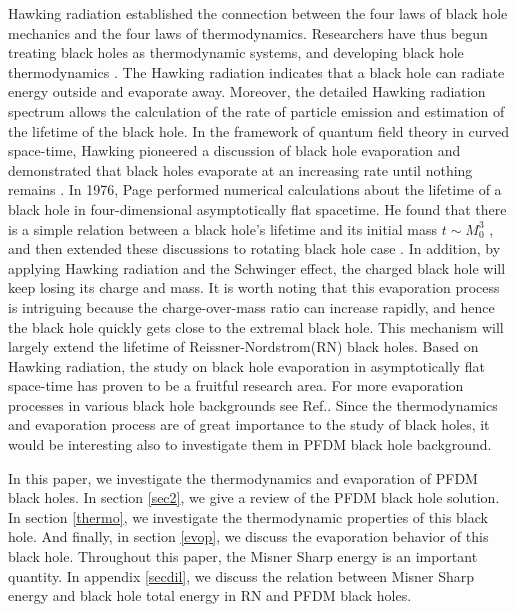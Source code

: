 \documentclass[a4paper,11pt]{article}
\begin{document}
Hawking radiation established the connection between the four laws of black hole mechanics and the four laws of thermodynamics. Researchers have thus begun treating black holes as thermodynamic systems, and developing black hole thermodynamics \cite{Hawking:1976de,Hawking:1982dh}. The Hawking radiation indicates that a black hole can radiate energy outside and evaporate away. Moreover, the detailed Hawking radiation spectrum allows the calculation of the rate of particle emission and estimation of the lifetime of the black hole. In the framework of quantum field theory in curved space-time, Hawking pioneered a discussion of black hole evaporation and demonstrated that black holes evaporate at an increasing rate until nothing remains \cite{Hawking:1974rv,Hawking:1975vcx}. In 1976, Page performed numerical calculations about the lifetime of a black hole in four-dimensional asymptotically flat spacetime. He found that there is a simple relation between a black hole's lifetime and its initial mass $t \sim M_0^3$ \cite{Page:1976df},  and then extended these discussions to rotating black hole case \cite{Page:1976ki}. In addition, by applying Hawking radiation and the Schwinger effect, the charged black hole will keep losing its charge and mass. It is worth noting that this evaporation process is intriguing  because the charge-over-mass ratio can increase rapidly, and hence the black hole quickly gets close to the extremal black hole. This mechanism will largely extend the lifetime of Reissner-Nordstrom(RN) black holes\cite{Hiscock:1990ex,Xu:2019wak}. Based on Hawking radiation, the study on black hole evaporation in asymptotically flat space-time has proven to be a fruitful research area. For more evaporation processes in various black hole backgrounds see Ref.\cite{Wu:2021zyl,Hou:2020yni,Xu:2020xsl}. Since the thermodynamics and evaporation process are of great importance to the study of black holes, it would be interesting also to investigate them in PFDM black hole background.

In this paper, we investigate the thermodynamics and evaporation of PFDM black holes. In section \ref{sec2}, we give a review of the PFDM black hole solution. In section \ref{thermo}, we investigate the thermodynamic properties of this black hole. And finally, in section \ref{evop}, we discuss the evaporation behavior of this black hole. Throughout this paper, the Misner Sharp energy is an important quantity. In appendix \ref{secdil}, we discuss the relation between Misner Sharp energy and black hole total energy in RN and PFDM black holes.
\end{document}
